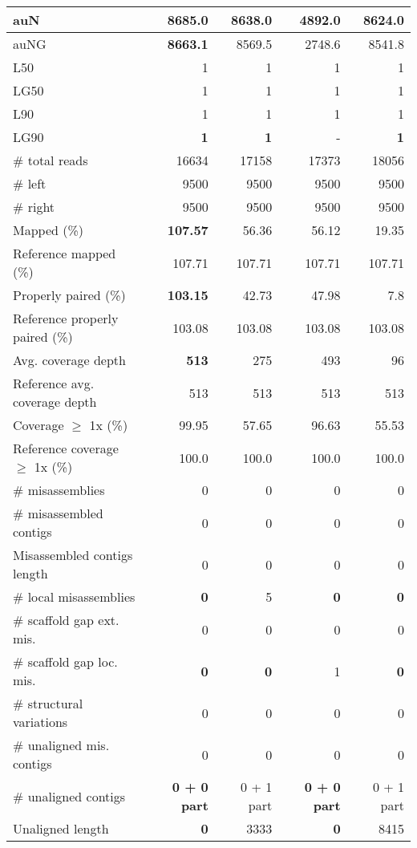 \documentclass[12pt,a4paper]{article}
\begin{document}
\begin{table}[ht]
\begin{center}
\begin{tabular}{|l*{4}{|r}|}
auN & {\bf 8685.0} & 8638.0 & 4892.0 & 8624.0 \\ \hline
auNG & {\bf 8663.1} & 8569.5 & 2748.6 & 8541.8 \\ \hline
L50 & 1 & 1 & 1 & 1 \\ \hline
LG50 & 1 & 1 & 1 & 1 \\ \hline
L90 & 1 & 1 & 1 & 1 \\ \hline
LG90 & {\bf 1} & {\bf 1} & - & {\bf 1} \\ \hline
\# total reads & 16634 & 17158 & 17373 & 18056 \\ \hline
\# left & 9500 & 9500 & 9500 & 9500 \\ \hline
\# right & 9500 & 9500 & 9500 & 9500 \\ \hline
Mapped (\%) & {\bf 107.57} & 56.36 & 56.12 & 19.35 \\ \hline
Reference mapped (\%) & 107.71 & 107.71 & 107.71 & 107.71 \\ \hline
Properly paired (\%) & {\bf 103.15} & 42.73 & 47.98 & 7.8 \\ \hline
Reference properly paired (\%) & 103.08 & 103.08 & 103.08 & 103.08 \\ \hline
Avg. coverage depth & {\bf 513} & 275 & 493 & 96 \\ \hline
Reference avg. coverage depth & 513 & 513 & 513 & 513 \\ \hline
Coverage $\geq$ 1x (\%) & 99.95 & 57.65 & 96.63 & 55.53 \\ \hline
Reference coverage $\geq$ 1x (\%) & 100.0 & 100.0 & 100.0 & 100.0 \\ \hline
\# misassemblies & 0 & 0 & 0 & 0 \\ \hline
\# misassembled contigs & 0 & 0 & 0 & 0 \\ \hline
Misassembled contigs length & 0 & 0 & 0 & 0 \\ \hline
\# local misassemblies & {\bf 0} & 5 & {\bf 0} & {\bf 0} \\ \hline
\# scaffold gap ext. mis. & 0 & 0 & 0 & 0 \\ \hline
\# scaffold gap loc. mis. & {\bf 0} & {\bf 0} & 1 & {\bf 0} \\ \hline
\# structural variations & 0 & 0 & 0 & 0 \\ \hline
\# unaligned mis. contigs & 0 & 0 & 0 & 0 \\ \hline
\# unaligned contigs & {\bf 0 + 0 part} & 0 + 1 part & {\bf 0 + 0 part} & 0 + 1 part \\ \hline
Unaligned length & {\bf 0} & 3333 & {\bf 0} & 8415 \\ \hline

\end{tabular}
\end{center}
\end{table}
\end{document}
